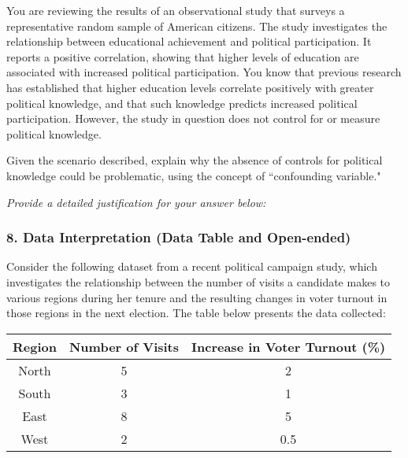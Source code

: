 \documentclass{article}
\begin{document}
You are reviewing the results of an observational study that surveys a representative random sample of American citizens. The study investigates the relationship between educational achievement and political participation. It reports a positive correlation, showing that higher levels of education are associated with increased political participation. You know that previous research has established that higher education levels correlate positively with greater political knowledge, and that such knowledge predicts increased political participation. However, the study in question does not control for or measure political knowledge.
\par Given the scenario described, explain why the absence of controls for political knowledge could be problematic, using the concept of ``confounding variable." \newline
    \par \emph{Provide a detailed justification for your answer below:}
    \begin{center}
    \end{center}

\subsubsection*{8. Data Interpretation (Data Table and Open-ended)}

Consider the following dataset from a recent political campaign study, which investigates the relationship between the number of visits a candidate makes to various regions during her tenure and the resulting changes in voter turnout in those regions in the next election. The table below presents the data collected:

\begin{center}
\begin{tabular}{|c|c|c|}
\hline
Region & Number of Visits & Increase in Voter Turnout (\%) \\
\hline 
North & 5 & 2 \\
South & 3 & 1 \\
East & 8 & 5 \\
West & 2 & 0.5 \\
\hline
\end{tabular}
\end{center}
\end{document}
